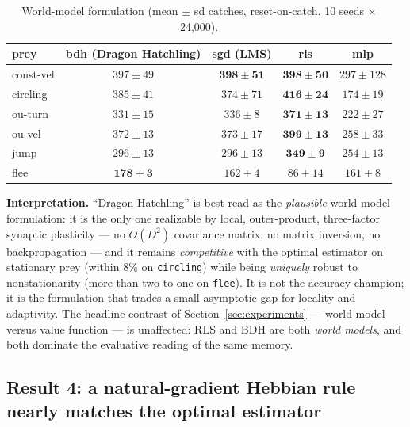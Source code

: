 \documentclass[11pt]{article}
\begin{document}
\begin{table}[t]
\centering
\caption{World-model formulation (mean $\pm$ sd catches, reset-on-catch, 10 seeds $\times$
24{,}000).}
\label{tab:formulation}
\small
\begin{tabular}{lcccc}
\toprule
prey & bdh (Dragon Hatchling) & sgd (LMS) & rls & mlp \\
\midrule
const-vel & \emph{$397 \pm 49$} & $\mathbf{398 \pm 51}$ & $\mathbf{398 \pm 50}$ & $297 \pm 128$ \\
circling  & \emph{$385 \pm 41$} & $374 \pm 71$ & $\mathbf{416 \pm 24}$ & $174 \pm 19$ \\
ou-turn   & $331 \pm 15$ & \emph{$336 \pm 8$}  & $\mathbf{371 \pm 13}$ & $222 \pm 27$ \\
ou-vel    & $372 \pm 13$ & \emph{$373 \pm 17$} & $\mathbf{399 \pm 13}$ & $258 \pm 33$ \\
jump      & \emph{$296 \pm 13$} & \emph{$296 \pm 13$} & $\mathbf{349 \pm 9}$  & $254 \pm 13$ \\
flee      & $\mathbf{178 \pm 3}$ & \emph{$162 \pm 4$} & $86 \pm 14$ & $161 \pm 8$ \\
\bottomrule
\end{tabular}
\end{table}

\textbf{Interpretation.} ``Dragon Hatchling'' is best read as the \emph{plausible} world-model
formulation: it is the only one realizable by local, outer-product, three-factor synaptic
plasticity --- no $O(D^2)$ covariance matrix, no matrix inversion, no backpropagation --- and it
remains \emph{competitive} with the optimal estimator on stationary prey (within $8\%$ on
\texttt{circling}) while being \emph{uniquely} robust to nonstationarity (more than two-to-one
on \texttt{flee}). It is not the accuracy champion; it is the formulation that trades a small
asymptotic gap for locality and adaptivity. The headline contrast of
Section~\ref{sec:experiments} --- world model versus value function --- is unaffected: RLS and
BDH are both \emph{world models}, and both dominate the evaluative reading of the same memory.

\subsection{Result 4: a natural-gradient Hebbian rule nearly matches the optimal
estimator}\label{sec:naturalgradient}
\end{document}
